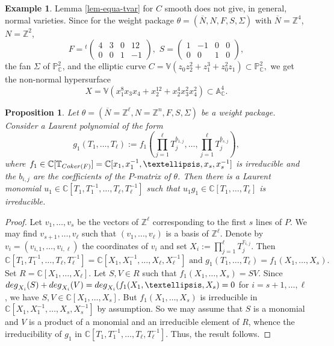 \documentclass[11pt, reqno]{amsart}
\theoremstyle{plain}
\newtheorem{proposition}[theorem]{Proposition}
\theoremstyle{definition}
\newtheorem{example}[theorem]{Example}
\theoremstyle{remark}
\begin{document}
\begin{example}
 Lemma \ref{lem-equa-tvar}  for $C$ smooth does not give, in general, normal varieties.
Since for the weight package $\theta =  (\overline{N}, N, F, S, \Sigma)$ with
$\overline{N} =  \mathbb{Z}^{4}$, $N =  \mathbb{Z}^{2}$,
$$F =  {}^{t}\begin{pmatrix}
  4 & 3  &  0 & 12 \\
  0& 0  &  1 & -1

\end{pmatrix}, \,\, S =  \begin{pmatrix}
 1 & -1  &  0 & 0\\
 0 & 0  &  1 & 0
\end{pmatrix}, $$
the fan $\Sigma$ of $\mathbb{P}^{2}_{\mathbb{C}}$, and the elliptic curve
$C = \mathbb{V}(z_{0}z_{2}^{2} + z_{1}^{3} + z_{0}^{2}z_{1}) \subset \mathbb{P}^{2}_{\mathbb{C}},$
we get the non-normal hypersurface
$$X  =  \mathbb{V}(x_{1}^{8}x_{3}x_{4} + x_{2}^{12} + x_{2}^{4}x_{3}^{2}x_{4}^{2})\subset \mathbb{A}^{4}_{\mathbb{C}}.$$
\end{example}
\begin{proposition}\label{prop-Construction2-irredhyper}
Let
$\theta =   (\overline{N}=  \mathbb{Z}^{\ell}, N  =  \mathbb{Z}^{n}, F, S,\Sigma)$ be a weight package. Consider
a Laurent polynomial of the form
$$g_{1}(T_{1}, \ldots, T_{\ell}):= f_{1}\left(\prod_{j = 1}^{\ell}T_{j}^{b_{1, j}}, \ldots, \prod_{j = 1}^{\ell}T_{j}^{b_{s, j}}\right),$$
where  $f_{1}\in\mathbb{C}[\mathbb{T}_{{\rm Coker}(F)}] =  \mathbb{C}[x_{1}, x_{1}^{-1}, \ldots, x_{s}, x_{s}^{-1}]$ is irreducible and the $b_{i, j}$ are the coefficients of the $P$-matrix of $\theta$. 
 Then there is a Laurent monomial $u_{1}\in \mathbb{C}[T_{1}, T_{1}^{-1}, \ldots, T_{\ell}, T_{\ell}^{-1}]$
such that $u_{1} g_{1}\in \mathbb{C}[T_{1}, \ldots, T_{\ell}]$ is irreducible. 
\end{proposition}
\begin{proof}
Let $v_{1}, \ldots, v_{s}$ be the vectors of $\mathbb{Z}^{\ell}$ corresponding to the first $s$ lines of $P$. We may find $v_{s+1}, \ldots, v_{\ell}$ such that $(v_{1}, \ldots, v_{\ell})$ is a basis of $\mathbb{Z}^{\ell}$. Denote 
by $v_{i} =  (v_{i, 1}, \ldots, v_{i, \ell})$ the coordinates of $v_{i}$ and set 
$X_{i}  := \prod_{j =  1}^{\ell} T_{j}^{v_{i, j}}.$
Then
$$\mathbb{C}[T_{1}, T_{1}^{-1}, \ldots, T_{\ell}, T_{\ell}^{-1}] =  \mathbb{C}[X_{1}, X_{1}^{-1}, \ldots, X_{\ell}, X_{\ell}^{-1}]
\text{ and }g_{1}(T_{1}, \ldots, T_{\ell}) =  f_{1}(X_{1},\ldots, X_{s}).$$  Set $R =  \mathbb{C}[X_{1}, \ldots, X_{\ell}]$. Let $S, V\in R$ such that $f_{1}(X_{1}, \ldots, X_{s})  =  SV$. Since 
${\rm deg}_{X_{i}}(S)  + {\rm deg}_{X_{i}}(V)  =  {\rm deg}_{X_{i}}(f_{1}(X_{1},\ldots, X_{s}) =  0$ for $i =  s+1, \ldots, \ell$, we have $S, V\in \mathbb{C}[X_{1},\ldots, X_{s}]$. But $f_{1}(X_{1},\ldots, X_{s})$ is irreducible in $\mathbb{C}[X_{1}, X_{1}^{-1}, \ldots, X_{s}, X_{s}^{-1}]$ by assumption. So we may 
assume that $S$ is a monomial and $V$ is a product of a monomial and an irreducible element of $R$,  whence the irreducibility of $g_{1}$ in $\mathbb{C}[T_{1}, T_{1}^{-1}, \ldots, T_{\ell}, T_{\ell}^{-1}]$. Thus, the result follows.
\end{proof}
\end{document}
